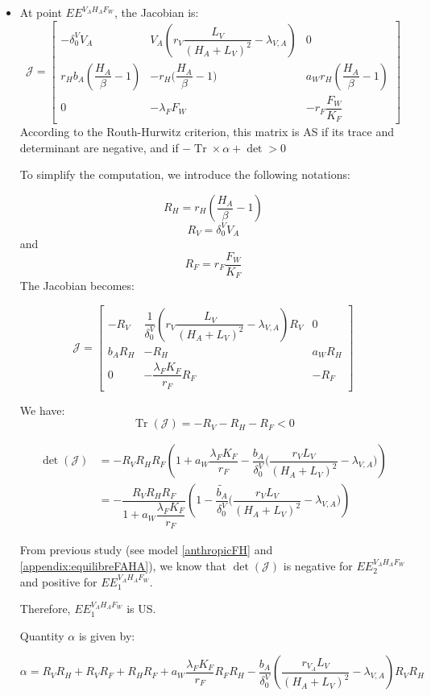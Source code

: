 \documentclass{article}
\newcommand{\lva}{\lambda_{V, A}}
\newcommand{\lfw}{\lambda_{F}}
\newcommand{\dv}{\delta_0^V}
\DeclareMathOperator{\Tr}{Tr}
\begin{document}
\begin{itemize}
\item At point $EE^{V_AH_AF_W}$, the Jacobian is:
\begin{equation}
\mathcal{J} = 
\begin{bmatrix}
-\dv V_A &  V_A\left(r_V \dfrac{L_V}{(H_A+L_V)^2} - \lva \right) & 0\\
r_H b_A\left(\dfrac{H_A}{\beta}-1\right) & -r_H \Big(\dfrac{H_A}{\beta}-1\Big) & a_W r_H \left(\dfrac{H_A}{\beta}-1\right) \\
0 & -\lfw F_W & -r_F \dfrac{F_W}{K_F}
\end{bmatrix}
\end{equation}
According to the Routh-Hurwitz criterion, this matrix is AS if its trace and determinant are negative, and if $-\Tr \times \alpha + \det > 0$

To simplify the computation, we introduce the following notations:

$$
R_H = r_H \left(\dfrac{H_A}{\beta}-1\right)
$$
$$
R_V = \dv V_A
$$
and
$$
R_F = r_F \dfrac{F_W}{K_F}
$$
The Jacobian becomes:

\begin{equation}
\mathcal{J} = 
\begin{bmatrix}
-R_V &  \dfrac{1}{\dv}\left(r_V \dfrac{L_V}{(H_A+L_V)^2} - \lva \right)R_V & 0\\
 b_AR_H & -R_H & a_W R_H \\
0 & -\dfrac{\lfw K_F}{r_F} R_F & -R_F
\end{bmatrix}
\end{equation}

We have:
$$
\Tr (\mathcal{J}) = - R_V - R_H - R_F < 0 
$$

\begin{align*}
\det(\mathcal{J}) &= -R_V R_H R_F \left(1 + a_W \dfrac{\lfw K_F}{r_F} - \dfrac{b_A}{\dv} \Big(\dfrac{r_V L_V}{(H_A + L_V)^2} - \lva \Big) \right) \\
&= - \dfrac{R_V R_H R_F}{1 + a_W \dfrac{\lfw K_F}{r_F}} \left(1 - \dfrac{\widetilde{b_A}}{\dv} \Big(\dfrac{r_V L_V}{(H_A + L_V)^2} - \lva \Big) \right)
\end{align*}

From previous study (see model \eqref{anthropicFH} and \ref{appendix:equilibreFAHA}), we know that $\det(\mathcal{J})$ is negative for $EE^{V_AH_AF_W}_2$ and positive for $EE^{V_AH_AF_W}_1$.

Therefore, $EE^{V_AH_AF_W}_1$ is US.

Quantity $\alpha$ is given by:

$$
\alpha = R_V R_H + R_V R_F + R_H R_F + a_W \dfrac{\lfw K_F}{r_F} R_F R_H -\dfrac{b_A}{\dv} \left(\dfrac{r_{V_A}L_V}{(H_A+L_V)^2} - \lva \right) R_V R_H
$$


\end{itemize}
\end{document}
